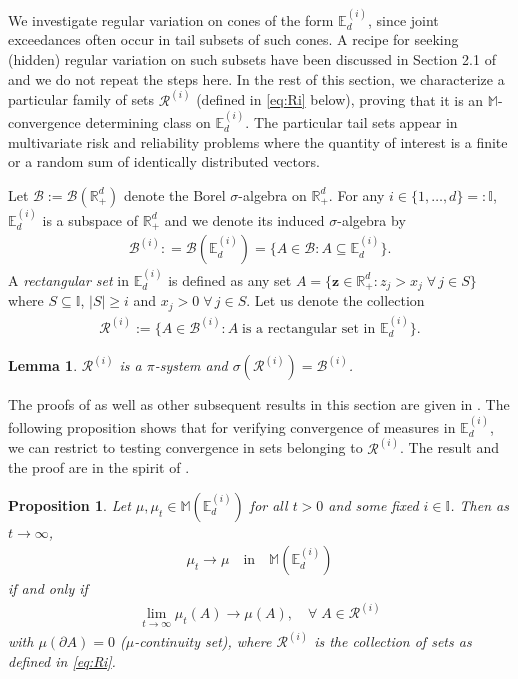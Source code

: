 \documentclass[aos]{imsart}
\numberwithin{equation}{section}
\theoremstyle{plain} %
\newtheorem{lemma}[theorem]{Lemma}
\newtheorem{proposition}[theorem]{Proposition}
\theoremstyle{remark}
\newcommand{\E}{\mathbb{E}}
\newcommand{\M}{\mathbb{M}}
\newcommand{\R}{\mathbb{R}}
\def\bI{\mathbb{I}}
\def\cB{\mathcal{B}}
\def\cR{\mathcal{R}}
\def\bz{\boldsymbol z}
\begin{document}
 We investigate regular variation on cones of the form $\E_d^{(i)}$, since joint exceedances often occur in tail subsets of such cones. A recipe for seeking (hidden) regular variation on such subsets have been discussed in Section 2.1 of \cite{das:fasen:kluppelberg:2022} and we do not repeat the steps here. In the rest of this section, we characterize a particular family of sets $\cR^{(i)}$ (defined in \eqref{eq:Ri} below), proving {that it is an $\M$-convergence determining class on $\E_d^{(i)}$}.  The particular tail sets appear in multivariate risk and reliability problems where the quantity of interest is a finite or a random sum of identically distributed vectors.


 Let $\cB:=\cB(\R_+^d)$ denote the Borel $\sigma$-algebra on $\R_+^d$. For any $i\in \{1,\ldots, d\}=:\mathbb{I}$,  $\E_d^{(i)}$ is a subspace of $\R_+^d$ and we denote its induced $\sigma$-algebra  by
\begin{align}\label{eq:Bi}
\cB^{(i)}: = \cB(\E_d^{(i)}) = \{A\in \cB: A\subseteq \E_d^{(i)} \}.
\end{align}
A \emph{rectangular set} in $\E_d^{(i)}$ is defined as any set $A= \{\bz \in \R_+^d: z_j>x_j\;\forall\, j\in S\}$ where $S\subseteq \mathbb{I}$, $|S|\ge i$ and $x_j>0\; \forall\, j\in S$. Let us denote the collection
\begin{align}\label{eq:Ri}
\cR^{(i)}:= \{A\in \cB^{(i)}: A \; \text{is a rectangular set in } \E_d^{(i)} \}.
\end{align}


\begin{lemma}\label{lem:RiisPi}
$\cR^{(i)}$ is a $\pi$-system and  $\sigma(\cR^{(i)})=\cB^{(i)}$.
\end{lemma}
The proofs of  as well as other subsequent results in this section are given in . 
The following proposition shows that for verifying convergence of measures in $\E_d^{(i)}$, we can restrict to testing convergence in sets belonging to $\cR^{(i)}$. The result and the proof are in the spirit of \cite[Lemma 6.1]{resnickbook:2007}. 
\begin{proposition} \label{prop:rectsetsforM}
Let $\mu, \mu_t \in \M(\E_d^{(i)})$ for all $t>0$ and some fixed $i\in \bI$. Then  as $t\to\infty$,
\begin{align}\label{Mcon:mut}
\mu_t \to \mu \quad \text{in} \quad \M(\E_d^{(i)})
\end{align}
 if and only if
 \begin{align}\label{Mcon:mutAy}
 \lim_{t\to\infty}\mu_t(A) \to \mu(A), \quad \forall\; A\in \cR^{(i)}
 \end{align}
with $\mu(\partial A)=0$ ($\mu$-continuity set), where $\cR^{(i)}$ is the collection of sets as defined in \eqref{eq:Ri}.
\end{proposition}
\end{document}
